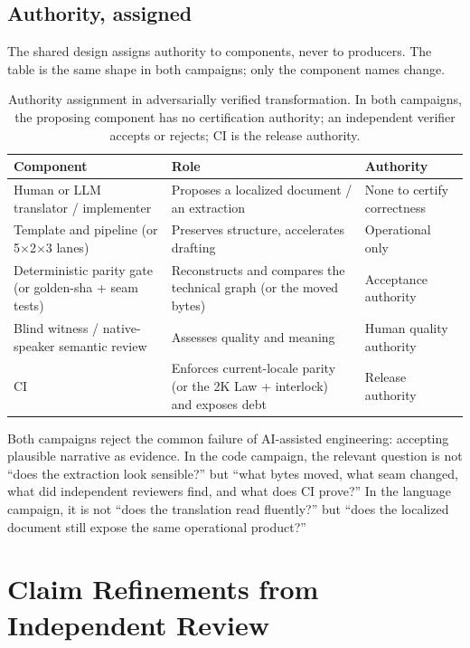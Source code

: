 \documentclass[11pt]{article}
\theoremstyle{definition}
\theoremstyle{plain}
\theoremstyle{remark}
\begin{document}
\subsection{Authority, assigned}

The shared design assigns authority to components, never to producers. The
table is the same shape in both campaigns; only the component names change.

\begin{table}[H]
\centering
\caption{Authority assignment in adversarially verified transformation. In
both campaigns, the proposing component has no certification authority; an
independent verifier accepts or rejects; CI is the release authority.}
\label{tab:authority}
\begin{tabular}{@{}p{}p{}p{}@{}}
\toprule
Component & Role & Authority \\
\midrule
Human or LLM translator / implementer & Proposes a localized document / an extraction & None to certify correctness \\
Template and pipeline (or 5$\times$2$\times$3 lanes) & Preserves structure, accelerates drafting & Operational only \\
Deterministic parity gate (or golden-sha + seam tests) & Reconstructs and compares the technical graph (or the moved bytes) & Acceptance authority \\
Blind witness / native-speaker semantic review & Assesses quality and meaning & Human quality authority \\
CI & Enforces current-locale parity (or the 2K Law + interlock) and exposes debt & Release authority \\
\bottomrule
\end{tabular}
\end{table}

Both campaigns reject the common failure of AI-assisted engineering:
accepting plausible narrative as evidence. In the code campaign, the relevant
question is not ``does the extraction look sensible?'' but ``what bytes
moved, what seam changed, what did independent reviewers find, and what does
CI prove?'' In the language campaign, it is not ``does the translation read
fluently?'' but ``does the localized document still expose the same
operational product?''

\section{Claim Refinements from Independent Review}
\label{sec:refinements}
\end{document}
